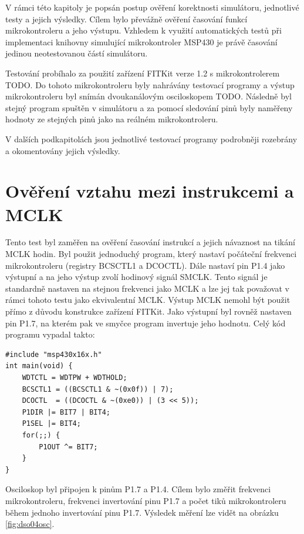 V rámci této kapitoly je popsán postup ověření korektnosti simulátoru, jednotlivé testy a jejich výsledky. Cílem bylo převážně ověření časování funkcí mikrokontroleru a jeho výstupu. Vzhledem k využití automatických testů při implementaci knihovny simulující mikrokontroler MSP430 je právě časování jedinou neotestovanou částí simulátoru.

Testování probíhalo za použití zařízení FITKit verze 1.2 s mikrokontrolerem TODO. Do tohoto mikrokontroleru byly nahrávány testovací programy a výstup mikrokontroleru byl snímán dvoukanálovým osciloskopem TODO. Následně byl stejný program spuštěn v simulátoru a za pomocí sledování pinů byly naměřeny hodnoty ze stejných pinů jako na reálném mikrokontroleru.

V dalších podkapitolách jsou jednotlivé testovací programy podrobněji rozebrány a okomentovány jejich výsledky.

\section{Ověření vztahu mezi instrukcemi a MCLK}
\label{test1}

Tento test byl zaměřen na ověření časování instrukcí a jejich návaznost na tikání MCLK hodin. Byl použit jednoduchý program, který nastaví počáteční frekvenci mikrokontroleru (registry BCSCTL1 a DCOCTL). Dále nastaví pin P1.4 jako výstupní a na jeho výstup zvolí hodinový signál SMCLK. Tento signál je standardně nastaven na stejnou frekvenci jako MCLK a lze jej tak považovat v rámci tohoto testu jako ekvivalentní MCLK. Výstup MCLK nemohl být použit přímo z důvodu konstrukce zařízení FITKit. Jako výstupní byl rovněž nastaven pin P1.7, na kterém pak ve smyčce program invertuje jeho hodnotu. Celý kód programu vypadal takto:

\lstset{language=XML, numbers=left, frame=single, breaklines=true, tabsize=2, xleftmargin=20pt}
\begin{lstlisting}
#include "msp430x16x.h"
int main(void) {
	WDTCTL = WDTPW + WDTHOLD;
	BCSCTL1 = ((BCSCTL1 & ~(0x0f)) | 7);
	DCOCTL  = ((DCOCTL & ~(0xe0)) | (3 << 5));
	P1DIR |= BIT7 | BIT4;
	P1SEL |= BIT4;
	for(;;) {
		P1OUT ^= BIT7;
	}
}
\end{lstlisting}

Osciloskop byl připojen k pinům P1.7 a P1.4. Cílem bylo změřit frekvenci mikrokontroleru, frekvenci invertování pinu P1.7 a počet tiků mikrokontroleru během jednoho invertování pinu P1.7. Výsledek měření lze vidět na obrázku \ref{fig:dso04osc}.

